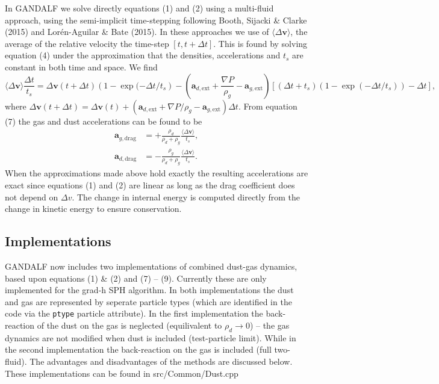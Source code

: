 \documentclass[a4paper]{article}
\renewcommand{\vec}[1]{\ensuremath{\mathbf{#1}}}
\begin{document}
In GANDALF we solve directly equations (1) and (2) using a multi-fluid approach, using the semi-implicit time-stepping following Booth, Sijacki \& Clarke (2015) and Lor\'en-Aguilar \& Bate (2015). In these approaches we use of $\langle \Delta \vec{v} \rangle$, the average of the relative velocity the time-step $\left[ t,t + \Delta t\right]$. This is found by solving equation (4) under the approximation that the densities, accelerations and $t_s$ are constant in both time and space. We find 
\begin{equation}
\langle \Delta \vec{v} \rangle \frac{\Delta t}{t_s} = \Delta \vec{v}(t+\Delta t) \left(1 - \exp(-\Delta t/ t_s\right) -
\left(\vec{a}_{d, \mathrm{ext}} + \frac{\nabla P}{\rho_g}  - \vec{a}_{g, \mathrm{ext}}\right)\left[(\Delta t + t_s)\left(1 - \exp(-\Delta t/ t_s)\right) - \Delta t \right],
\end{equation}
where $ \Delta \vec{v}(t+\Delta t) = \Delta \vec{v} (t) + \left(\vec{a}_{d, \mathrm{ext}} + \nabla P/\rho_g  - \vec{a}_{g, \mathrm{ext}}\right) \Delta t$. From equation (7) the gas and dust accelerations can be found to be
\begin{align}
\vec{a}_{g,\mathrm{drag}} &= + \frac{\rho_d}{\rho_d + \rho_g} \frac{\langle \Delta \vec{v} \rangle}{t_s}, \\
\vec{a}_{d,\mathrm{drag}} &= - \frac{\rho_g}{\rho_d + \rho_g} \frac{\langle \Delta \vec{v} \rangle}{t_s}.
\end{align}
When the approximations made above hold exactly the resulting accelerations are exact since equations (1) and (2) are linear as long as the drag coefficient does not depend on $\Delta v$. The change in internal energy is computed directly from the change in kinetic energy to ensure conservation.

\subsection{Implementations}

GANDALF now includes two implementations of combined dust-gas dynamics, based upon equations (1) \& (2) and  (7) -- (9). Currently these are only implemented for the grad-h SPH algorithm. In both implementations the dust and gas are represented by seperate particle types (which are identified in the code via the \lstinline{ptype} particle attribute). In the first implementation the back-reaction of the dust on the gas is neglected (equilivalent to  $\rho_d \rightarrow 0$) -- the gas dynamics are not modified when dust is included (test-particle limit). While in the second implementation the back-reaction on the gas is included (full two-fluid). The advantages and disadvantages of the methods are discussed below. These implementations can be found in src/Common/Dust.cpp
\end{document}
